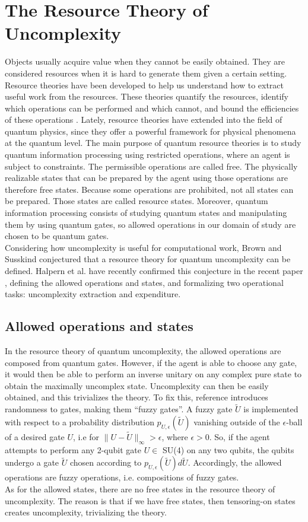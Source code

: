 \chapter{The Resource Theory of Uncomplexity}
Objects usually acquire value when they cannot be easily obtained. They are considered resources when it is hard to generate them given a certain setting. Resource theories have been developed to help us understand how to extract useful work from the resources. These theories quantify the resources, identify which operations can be performed and which cannot, and bound the  efficiencies of these operations \cite{coecke2016mathematical,chitambar2019quantum}. Lately, resource theories have extended into the field of quantum physics, since they offer a powerful framework for physical phenomena at the quantum level. The main purpose of quantum resource theories is to study quantum information processing using restricted operations, where an agent is subject to constraints. The permissible operations are called free. The physically realizable states that can be prepared by the agent using those operations are therefore free states. Because some operations are prohibited, not all states can be prepared. Those states are called resource states. Moreover, quantum information processing consists of studying quantum states and manipulating them by using quantum gates, so allowed operations in our domain of study are chosen to be quantum gates.
\\
Considering how uncomplexity is useful for computational work, Brown and Susskind conjectured that a resource theory for quantum uncomplexity can be defined. Halpern et al. have recently confirmed this conjecture in the recent paper \cite{halpern2021resource}, defining the allowed operations and states, and formalizing two operational tasks: uncomplexity extraction and expenditure.

\section{Allowed operations and states}
In the resource theory of quantum uncomplexity, the allowed operations are composed from quantum gates. However, if the agent is able to choose any gate, it would then be able to perform an inverse unitary on any complex pure state to obtain the maximally uncomplex state. Uncomplexity can then be easily obtained, and this trivializes the theory. To fix this, reference \cite{halpern2021resource} introduces randomness to gates, making them ``fuzzy gates''. A fuzzy gate $\tilde{U}$ is implemented with respect to a probability distribution $\textit{p}_{\textit{U},\epsilon}(\tilde{U})$ vanishing outside of the $\epsilon$-ball of a desired gate $\textit{U}$, i.e for $\|U - \tilde{U} \| _\infty > \epsilon$, where $\epsilon > 0$. So, if the agent attempts to perform any 2-qubit gate $U \in$ SU(4) on any two qubits, the qubits undergo a gate $\tilde{U}$ chosen according to $\textit{p}_{U,\epsilon}(\tilde{U})d\tilde{U}$. Accordingly, the allowed operations are fuzzy operations, i.e. compositions of fuzzy gates.
\\
As for the allowed states, there are no free states in the resource theory of uncomplexity. The reason is that if we have free states, then tensoring-on states creates uncomplexity, trivializing the theory. 
